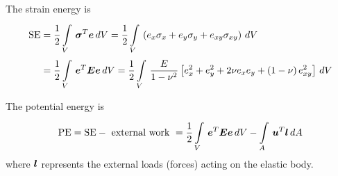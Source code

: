 The strain energy is 
\begin{align*}
  \text{SE} &= \dfrac{1}{2} \goneint{\transpose{\vect{\sigma}}\vect{e}}{V} = \dfrac{1}{2}
  \goneint{\pbrac{e_{x}\sigma_{x} + e_{y}\sigma_{y} + e_{xy}\sigma_{xy}}}{V} \\ &=
  \dfrac{1}{2} \goneint{\transpose{\vect{e}}\matr{E}\vect{e}}{V} = \dfrac{1}{2}
  \goneint{\dfrac{E}{1-\nu^{2}} \sqbrac{e_{x}^{2} + e_{y}^{2} + 2\nu e_{x}e_{y} +
      \pbrac{1-\nu}e_{xy}^{2}}}{V}
\end{align*}

The potential energy is
\begin{equation}
  \text{PE} = \text{SE} -\text{ external work }= \dfrac{1}{2}
  \goneint{\transpose{\vect{e}}\matr{E}\vect{e}}{V} -
  \goneint{\transpose{\vect{u}}\vect{l}}{A} 
  \label{eqn:pe}
\end{equation}
where $\vect{l}$ represents the external loads (forces) acting on the elastic
body.

